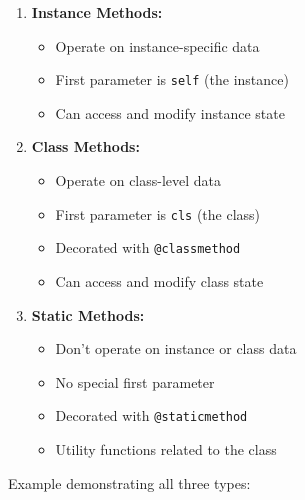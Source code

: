 \begin{enumerate}
\def\labelenumi{\arabic{enumi}.}
\tightlist
\item
  \textbf{Instance Methods:}

  \begin{itemize}
  \tightlist
  \item
    Operate on instance-specific data
  \item
    First parameter is \texttt{self} (the instance)
  \item
    Can access and modify instance state
  \end{itemize}
\item
  \textbf{Class Methods:}

  \begin{itemize}
  \tightlist
  \item
    Operate on class-level data
  \item
    First parameter is \texttt{cls} (the class)
  \item
    Decorated with \texttt{@classmethod}
  \item
    Can access and modify class state
  \end{itemize}
\item
  \textbf{Static Methods:}

  \begin{itemize}
  \tightlist
  \item
    Don't operate on instance or class data
  \item
    No special first parameter
  \item
    Decorated with \texttt{@staticmethod}
  \item
    Utility functions related to the class
  \end{itemize}
\end{enumerate}

Example demonstrating all three types:

